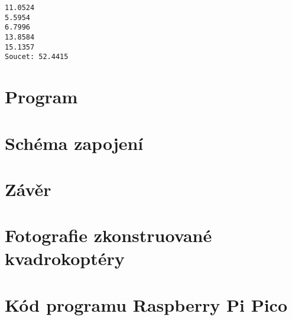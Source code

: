 \documentclass[12pt]{report}
\begin{document}
\lipsum[1]	

\begin{lstlisting}[numbers=none, title={Příklad výstupního souboru}]
11.0524
5.5954
6.7996
13.8584
15.1357
Soucet: 52.4415
\end{lstlisting}

\chapter{Program}

\lipsum[1]

\chapter{Schéma zapojení}

\lipsum[1]

\chapter*{Závěr}
	
\lipsum[1]
	
\nocite{*}
\printbibliography					%
\printglossary[title={Zkratky}]		%
\listoffigures						%
\listoftables						%

\begin{appendices}
	\chapter{Fotografie zkonstruované kvadrokoptéry}	
	\lipsum[1]
	\chapter{Kód programu Raspberry Pi Pico}  
\end{appendices}
\end{document}
